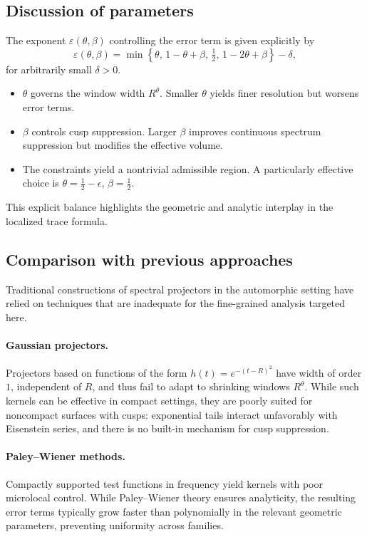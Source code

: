 \subsection{Discussion of parameters}\label{subsec:params}

The exponent $\varepsilon(\theta,\beta)$ controlling the error term is given explicitly by
\[
  \varepsilon(\theta,\beta) = \min\!\left\{ \theta,\,1-\theta+\beta,\,\tfrac{1}{2},\,1-2\theta+\beta \right\} - \delta,
\]
for arbitrarily small $\delta>0$.  

\begin{itemize}
  \item $\theta$ governs the window width $R^\theta$. Smaller $\theta$ yields finer 
        resolution but worsens error terms.
  \item $\beta$ controls cusp suppression. Larger $\beta$ improves continuous spectrum 
        suppression but modifies the effective volume.
  \item The constraints yield a nontrivial admissible region. A particularly effective 
        choice is $\theta=\tfrac{1}{2}-\epsilon$, $\beta=\tfrac{1}{2}$.
\end{itemize}

This explicit balance highlights the geometric and analytic interplay in the localized 
trace formula.

\subsection{Comparison with previous approaches}\label{subsec:comparison}

Traditional constructions of spectral projectors in the automorphic setting have relied 
on techniques that are inadequate for the fine-grained analysis targeted here.

\paragraph{Gaussian projectors.}
Projectors based on functions of the form $h(t) = e^{-(t-R)^2}$ have width of order $1$, 
independent of $R$, and thus fail to adapt to shrinking windows $R^\theta$. While such 
kernels can be effective in compact settings, they are poorly suited for noncompact 
surfaces with cusps: exponential tails interact unfavorably with Eisenstein series, and 
there is no built-in mechanism for cusp suppression.

\paragraph{Paley–Wiener methods.}
Compactly supported test functions in frequency yield kernels with poor microlocal 
control. While Paley–Wiener theory ensures analyticity, the resulting error terms 
typically grow faster than polynomially in the relevant geometric parameters, preventing 
uniformity across families.

